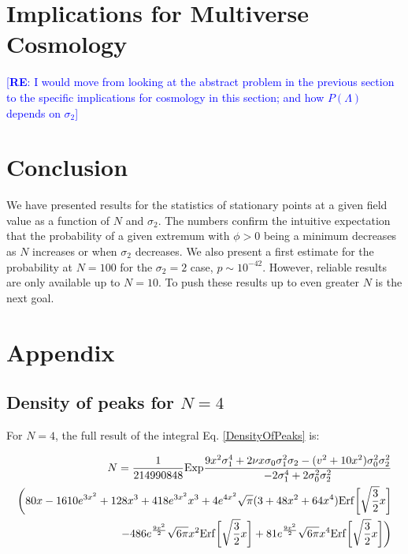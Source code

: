 \documentclass[12pt]{article}
\newcommand{\re}[1]{\textcolor{blue}{[{\bf RE}: #1]}}
\begin{document}

\section{Implications for Multiverse Cosmology}

\re{I would move from looking at the abstract problem in the previous section to the specific implications for cosmology in this section; and how $P(\Lambda)$ depends on $\sigma_2$}

\section{Conclusion}
We have presented results for the statistics of stationary points at a given field value as a function of $N$ and $\sigma_2$. The numbers confirm the intuitive expectation that the probability of a given extremum with $\phi > 0$ being a minimum decreases as $N$ increases or when $\sigma_2$ decreases. We also present a first estimate for the probability at $N=100$ for the $\sigma_2=2$ case, $p \sim 10^{-42}$. However, reliable results are only available up to $N=10$. To push these results up to even greater $N$ is the next goal.

\section{Appendix}
\subsection{Density of peaks for $N=4$} 
For $N=4$, the full result of the integral Eq. \ref{DensityOfPeaks} is:

\begin{equation}
\begin{split}
N = \frac{1}{214990848} \mathrm{Exp}\frac{9x^2\sigma_1^4 + 2\nu x \sigma_0 \sigma_1^2 \sigma_2 - (v^2+10x^2)\sigma_0^2\sigma_2^2}{-2\sigma_1^4+2\sigma_0^2\sigma_2^2}\\\bigg{(}80x - 1610e^{3x^2}+128x^3+418e^{3x^2}x^3+4e^{4x^2}\sqrt{\pi}(3+48x^2+64x^4)\mathrm{Erf}\bigg{[}\sqrt{\frac{3}{2}}x\bigg{]}\\
-486e^{\frac{9x^2}{2}}\sqrt{6\pi}x^2\mathrm{Erf}\bigg{[}\sqrt{\frac{3}{2}}x\bigg{]}+81e^{\frac{9x^2}{2}}\sqrt{6\pi}x^4\mathrm{Erf}\bigg{[}\sqrt{\frac{3}{2}}x\bigg{]}\bigg{)}
\end{split}
\end{equation}
\end{document}
